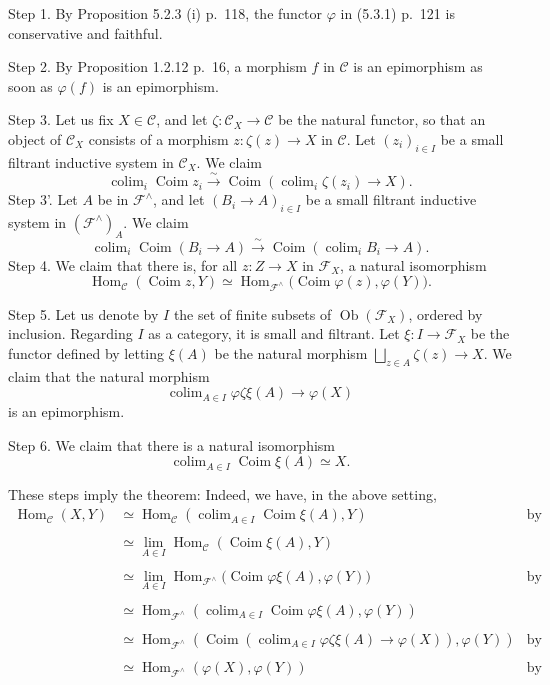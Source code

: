 \documentclass[12pt]{article}
\theoremstyle{remark}%
\newcommand{\n}{\noindent}
\newcommand{\C}{\mathcal C}
\newcommand{\F}{\mathcal F}
\newcommand{\p}{\varphi}
\DeclareMathOperator*{\coli}{colim}
\DeclareMathOperator{\Coim}{Coim}
\DeclareMathOperator{\Hom}{Hom}
\DeclareMathOperator{\Ob}{Ob}
\begin{document}
\n Step 1. By Proposition 5.2.3 (i) p.~118, the functor $\p$ in (5.3.1) p.~121 is conservative and faithful.

\n Step 2. By Proposition 1.2.12 p.~16, a morphism $f$ in $\C$ is an epimorphism as soon as $\p(f)$ is an epimorphism.

\n Step 3. Let us fix $X\in\C$, and let $\zeta:\C_X\to\C$ be the natural functor, so that an object of $\C_X$ consists of a morphism $z:\zeta(z)\to X$ in $\C$. Let $(z_i)_{i\in I}$ be a small filtrant inductive system in $\C_X$. We claim 
$$
\coli_i\Coim z_i\xrightarrow{\sim}
\Coim\left(\coli_i\zeta(z_i)\to X\right).
$$
\n Step 3'. Let $A$ be in $\F^\wedge$, and let $(B_i\to A)_{i\in I}$ be a small filtrant inductive system in $(\F^\wedge)_A$. We claim 
$$
\coli_i\Coim(B_i\to A)\xrightarrow{\sim}
\Coim\left(\coli_iB_i\to A\right).
$$
Step 4. We claim that there is, for all $z:Z\to X$ in $\F_X$, a natural isomorphism 
$$\Hom_\C(\Coim z,Y)\simeq\Hom_{\F^\wedge}\Big(\Coim\p(z),\p(Y)\Big).
$$ 

\n Step 5. Let us denote by $I$ the set of finite subsets of $\Ob(\F_X)$, ordered by inclusion. Regarding $I$ as a category, it is small and filtrant. Let $\xi:I\to\F_X$ be the functor defined by letting $\xi(A)$ be the natural morphism $\bigsqcup_{z\in A}\zeta(z)\to X$. We claim that the natural morphism 
$$
\coli_{A\in I}\p\zeta\xi(A)\to\p(X) 
$$ 
is an epimorphism.

\n Step 6. We claim that there is a natural isomorphism 
$$
\coli_{A\in I}\Coim\xi(A)\simeq X. 
$$

These steps imply the theorem: Indeed, we have, in the above setting, 
%
\begin{align*} 
%
\Hom_\C(X,Y)&\simeq\Hom_\C\left(\coli_{A\in I}\Coim\xi(A),Y\right)&\text{by Step 6}\\ \\ 
%
&\simeq\lim_{A\in I}\Hom_\C(\Coim\xi(A),Y)\\ \\ 
% 
&\simeq\lim_{A\in I}\Hom_{\F^\wedge}\Big(\Coim\p\xi(A),\p(Y)\Big)&\text{by Step 4}\\ \\ 
%
&\simeq\Hom_{\F^\wedge}\left(\coli_{A\in I}\Coim\p\xi(A),\p(Y)\right)\\ \\ 
%
&\simeq\Hom_{\F^\wedge}\left(\Coim\left(\coli_{A\in I}\p\zeta\xi(A)\to\p(X)\right),\p(Y)\right)&\text{by Step 3'}\\ \\ 
%
&\simeq\Hom_{\F^\wedge}(\p(X),\p(Y))&\text{by Step 5.}
%
\end{align*} 
%
\end{document}

